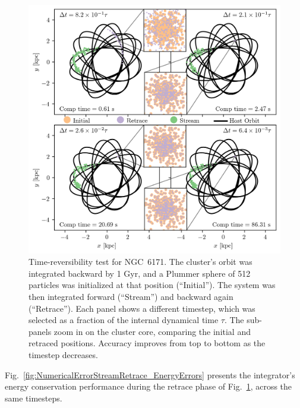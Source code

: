         \begin{figure}
            \centering
            \includegraphics[width=\linewidth]{images/NumericalErrorStreamRetrace_NGC6171.png}
            \caption[Time-reversibility for full stream generation]{Time-reversibility test for NGC~6171. The cluster's orbit was integrated backward by 1 Gyr, and a Plummer sphere of 512 particles was initialized at that position (``Initial''). The system was then integrated forward (``Stream'') and backward again (``Retrace''). Each panel shows a different timestep, which was selected as a fraction of the internal dynamical time $\tau$. The sub-panels zoom in on the cluster core, comparing the initial and retraced positions. Accuracy improves from top to bottom as the timestep decreases.}
            \label{fig:NumericalErrorStreamRetrace_NGC6171}
        \end{figure}

        Fig.~\ref{fig:NumericalErrorStreamRetrace_EnergyErrors} presents the integrator's energy conservation performance during the retrace phase of Fig.~\ref{fig:NumericalErrorStreamRetrace_NGC6171}, across the same timesteps.

